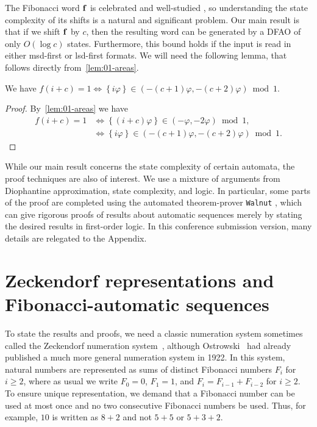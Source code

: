 \documentclass[12pt,runningheads]{llncs}
\renewcommand{\phi}{\varphi}
\newcommand{\fract}[1]{\left\{ #1 \right\}}
\begin{document}
The Fibonacci word $\bf f$ is celebrated and well-studied \cite{Berstel:1986b}, so understanding the state complexity of its shifts is a natural and significant problem.  Our main result is that if we shift $\bf f$ by $c$, then the resulting word can be generated by a DFAO of only $O(\log c)$ states.  Furthermore, this bound holds if the input is read in either msd-first or lsd-first formats. We will need the following lemma, that follows directly from~\cref{lem:01-areas}. 

\begin{lemma} \label{lemma:f(i+c)-ialpha}
    We have $f(i+c) = 1 \iff \fract{i\phi} \in (-(c+1)\phi, -(c+2)\phi)\bmod 1$.
\end{lemma}
\begin{proof}
    By~\cref{lem:01-areas} we have 
    \begin{align*}
        f(i+c) = 1
    	& \iff
    	\fract{(i+c)\phi} \in (-\phi, -2\phi)\bmod 1, \\
        & \iff
    	\fract{i\phi} \in (-(c+1)\phi,-(c+2)\phi)\bmod 1. 
    \end{align*}
\end{proof}

While our main result concerns the state complexity of certain automata, the proof techniques are also of interest.  We use a mixture of arguments from Diophantine approximation, state complexity, and logic.  In particular, some parts of the proof are completed using the automated theorem-prover {\tt Walnut} \cite{Mousavi:2021,Shallit:2023}, which can give rigorous proofs of results about automatic sequences merely by stating the desired results in first-order logic.  In this conference submission version, many details are relegated to the Appendix.  


\section{Zeckendorf representations and Fibonacci-automatic sequences}\label{sec:zeck}

To state the results and proofs, we need a classic numeration system sometimes called the Zeckendorf numeration system~\cite{Lekkerkerker:1952,Zeckendorf:1972}, although Ostrowski~\cite{Ostrowski:1922} had already published a much more general numeration system in 1922. In this system, natural numbers are represented as sums of distinct Fibonacci numbers $F_i$ for $i \geq 2$, where as usual we write $F_0 = 0$, $F_1 = 1$, and $F_i = F_{i-1} + F_{i-2}$ for $i \geq 2$. To ensure unique representation, we demand that a Fibonacci number can be used at most once and no two consecutive Fibonacci numbers be used.  Thus, for example, $10$ is written as $8+2$ and not $5+5$ or $5+3+2$.
\end{document}
